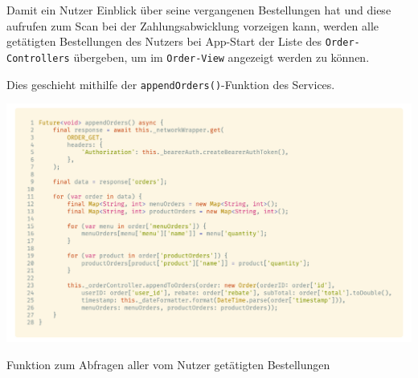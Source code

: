 Damit ein Nutzer Einblick über seine vergangenen Bestellungen hat und diese aufrufen zum Scan 
bei der Zahlungsabwicklung vorzeigen kann, werden alle getätigten Bestellungen des Nutzers bei App-Start
der Liste des \lstinline{Order-Controllers} übergeben, um im \lstinline{Order-View} angezeigt werden zu können.

Dies geschieht mithilfe der \lstinline{appendOrders()}-Funktion des Services.

\begin{code}
    \centering
    \includegraphics[width=1\textwidth]{images/Client/services/manage-orders/appendOrders.png}
    \vspace{-25pt}
    \caption{Funktion zum Abfragen aller vom Nutzer getätigten Bestellungen}
\end{code}